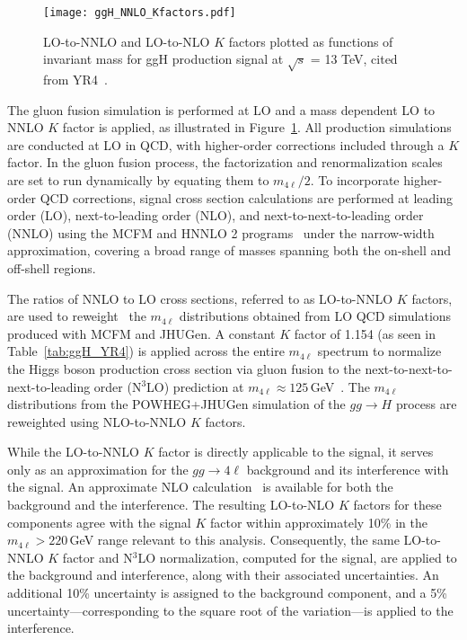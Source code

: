 \begin{figure}[!hbt]
\centering
\texttt{[image: ggH\_NNLO\_Kfactors.pdf]}
\caption {LO-to-NNLO and LO-to-NLO $K$ factors plotted as functions of invariant mass for ggH production signal at $\sqrt{s}$ = 13 TeV, cited from YR4~\cite{YellowRep4}.}
\label{fig:kfggf}
\end{figure}

The gluon fusion simulation is performed at LO and a mass dependent LO to NNLO $K$ factor is applied, as illustrated in Figure~\ref{fig:kfggf}. 
All \offshell production simulations are conducted at LO in QCD, with higher-order corrections 
included through a $K$ factor. In the gluon fusion process, the factorization and renormalization scales are set to run dynamically by equating them to $m_{4\ell}/2$. To incorporate higher-order QCD corrections, signal cross section calculations are performed at leading order (LO), next-to-leading order (NLO), and next-to-next-to-leading order (NNLO) using the MCFM and HNNLO 2 programs~\cite{Catani:2007vq,Grazzini:2008tf,Grazzini:2013mca} under the narrow-width approximation, covering a broad range of masses spanning both the on-shell and off-shell regions.

The ratios of NNLO to LO cross sections, referred to as LO-to-NNLO $K$ factors, are used to reweight~\cite{deFlorian:2016spz} the $m_{4\ell}$ distributions obtained from LO QCD simulations produced with MCFM and JHUGen. A constant $K$ factor of 1.154 (as seen in Table~\ref{tab:ggH_YR4}) is applied across the entire $m_{4\ell}$ spectrum to normalize the Higgs boson production cross section via gluon fusion to the next-to-next-to-next-to-leading order (N$^3$LO) prediction at $m_{4\ell} \approx 125$\,GeV~\cite{deFlorian:2016spz}. The $m_{4\ell}$ distributions from the POWHEG+JHUGen simulation of the $gg \to H$ process are reweighted using NLO-to-NNLO $K$ factors.

While the LO-to-NNLO $K$ factor is directly applicable to the signal, it serves only as an approximation for the $gg \to 4\ell$ background and its interference with the signal. An approximate NLO calculation~\cite{Caola:2015psa,Melnikov:2015laa,Campbell:2016ivq,Caola:2016trd} is available for both the background and the interference. The resulting LO-to-NLO $K$ factors for these components agree with the signal $K$ factor within approximately 10\% in the $m_{4\ell} > 220$\,GeV range relevant to this analysis. Consequently, the same LO-to-NNLO $K$ factor and N$^3$LO normalization, computed for the signal, are applied to the background and interference, along with their associated uncertainties. An additional 10\% uncertainty is assigned to the background component, and a 5\% uncertainty---corresponding to the square root of the variation---is applied to the interference.

